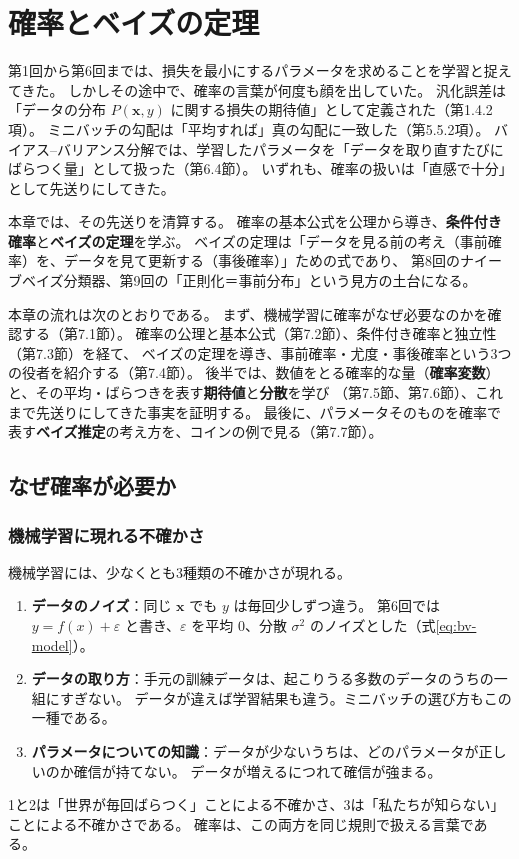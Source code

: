 \section{確率とベイズの定理}

第1回から第6回までは、損失を最小にするパラメータを求めることを学習と捉えてきた。
しかしその途中で、確率の言葉が何度も顔を出していた。
汎化誤差は「データの分布 $P(\bm{x}, y)$ に関する損失の期待値」として定義された（第1.4.2項）。
ミニバッチの勾配は「平均すれば」真の勾配に一致した（第5.5.2項）。
バイアス--バリアンス分解では、学習したパラメータを「データを取り直すたびにばらつく量」として扱った（第6.4節）。
いずれも、確率の扱いは「直感で十分」として先送りにしてきた。

本章では、その先送りを清算する。
確率の基本公式を公理から導き、\textbf{条件付き確率}と\textbf{ベイズの定理}を学ぶ。
ベイズの定理は「データを見る前の考え（事前確率）を、データを見て更新する（事後確率）」ための式であり、
第8回のナイーブベイズ分類器、第9回の「正則化＝事前分布」という見方の土台になる。

本章の流れは次のとおりである。
まず、機械学習に確率がなぜ必要なのかを確認する（第7.1節）。
確率の公理と基本公式（第7.2節）、条件付き確率と独立性（第7.3節）を経て、
ベイズの定理を導き、事前確率・尤度・事後確率という3つの役者を紹介する（第7.4節）。
後半では、数値をとる確率的な量（\textbf{確率変数}）と、その平均・ばらつきを表す\textbf{期待値}と\textbf{分散}を学び
（第7.5節、第7.6節）、これまで先送りにしてきた事実を証明する。
最後に、パラメータそのものを確率で表す\textbf{ベイズ推定}の考え方を、コインの例で見る（第7.7節）。


\subsection{なぜ確率が必要か}

\subsubsection{機械学習に現れる不確かさ}

機械学習には、少なくとも3種類の不確かさが現れる。
\begin{enumerate}
  \item \textbf{データのノイズ}：同じ $\bm{x}$ でも $y$ は毎回少しずつ違う。
    第6回では $y = f(x) + \varepsilon$ と書き、$\varepsilon$ を平均 $0$、分散 $\sigma^2$ のノイズとした（式\eqref{eq:bv-model}）。
  \item \textbf{データの取り方}：手元の訓練データは、起こりうる多数のデータのうちの一組にすぎない。
    データが違えば学習結果も違う。ミニバッチの選び方もこの一種である。
  \item \textbf{パラメータについての知識}：データが少ないうちは、どのパラメータが正しいのか確信が持てない。
    データが増えるにつれて確信が強まる。
\end{enumerate}
1と2は「世界が毎回ばらつく」ことによる不確かさ、3は「私たちが知らない」ことによる不確かさである。
確率は、この両方を同じ規則で扱える言葉である。

